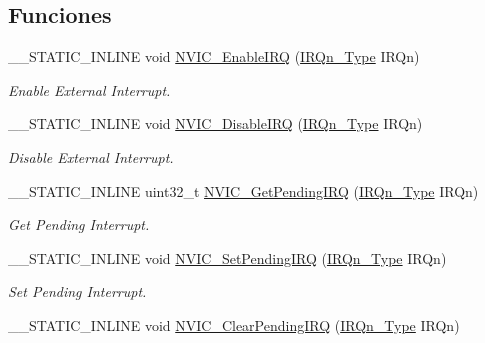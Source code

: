 \subsection*{Funciones}
\begin{DoxyCompactItemize}
\item 
\+\_\+\+\_\+\+S\+T\+A\+T\+I\+C\+\_\+\+I\+N\+L\+I\+NE void \hyperlink{group___c_m_s_i_s___core___n_v_i_c_functions_ga3349f2e3580d7ce22d6530b7294e5921}{N\+V\+I\+C\+\_\+\+Enable\+I\+RQ} (\hyperlink{group___c_m_s_i_s__43_x_x___i_r_q_ga2018a6433701e9ee9b34797425127919}{I\+R\+Qn\+\_\+\+Type} I\+R\+Qn)
\begin{DoxyCompactList}\small\item\em Enable External Interrupt. \end{DoxyCompactList}\item 
\+\_\+\+\_\+\+S\+T\+A\+T\+I\+C\+\_\+\+I\+N\+L\+I\+NE void \hyperlink{group___c_m_s_i_s___core___n_v_i_c_functions_ga260fba04ac8346855c57f091d4ee1e71}{N\+V\+I\+C\+\_\+\+Disable\+I\+RQ} (\hyperlink{group___c_m_s_i_s__43_x_x___i_r_q_ga2018a6433701e9ee9b34797425127919}{I\+R\+Qn\+\_\+\+Type} I\+R\+Qn)
\begin{DoxyCompactList}\small\item\em Disable External Interrupt. \end{DoxyCompactList}\item 
\+\_\+\+\_\+\+S\+T\+A\+T\+I\+C\+\_\+\+I\+N\+L\+I\+NE uint32\+\_\+t \hyperlink{group___c_m_s_i_s___core___n_v_i_c_functions_gafec8042db64c0f8ed432b6c8386a05d8}{N\+V\+I\+C\+\_\+\+Get\+Pending\+I\+RQ} (\hyperlink{group___c_m_s_i_s__43_x_x___i_r_q_ga2018a6433701e9ee9b34797425127919}{I\+R\+Qn\+\_\+\+Type} I\+R\+Qn)
\begin{DoxyCompactList}\small\item\em Get Pending Interrupt. \end{DoxyCompactList}\item 
\+\_\+\+\_\+\+S\+T\+A\+T\+I\+C\+\_\+\+I\+N\+L\+I\+NE void \hyperlink{group___c_m_s_i_s___core___n_v_i_c_functions_ga3ecf446519da33e1690deffbf5be505f}{N\+V\+I\+C\+\_\+\+Set\+Pending\+I\+RQ} (\hyperlink{group___c_m_s_i_s__43_x_x___i_r_q_ga2018a6433701e9ee9b34797425127919}{I\+R\+Qn\+\_\+\+Type} I\+R\+Qn)
\begin{DoxyCompactList}\small\item\em Set Pending Interrupt. \end{DoxyCompactList}\item 
\+\_\+\+\_\+\+S\+T\+A\+T\+I\+C\+\_\+\+I\+N\+L\+I\+NE void \hyperlink{group___c_m_s_i_s___core___n_v_i_c_functions_ga332e10ef9605dc6eb10b9e14511930f8}{N\+V\+I\+C\+\_\+\+Clear\+Pending\+I\+RQ} (\hyperlink{group___c_m_s_i_s__43_x_x___i_r_q_ga2018a6433701e9ee9b34797425127919}{I\+R\+Qn\+\_\+\+Type} I\+R\+Qn)

\end{DoxyCompactItemize}
